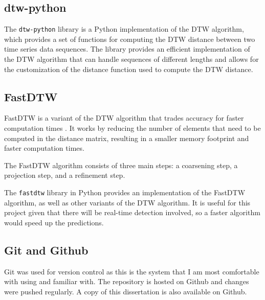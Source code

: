 \documentclass[final,rdr32.tex]{subfiles}
\begin{document}
\subsection{dtw-python}

The \verb|dtw-python| library is a Python implementation of the DTW algorithm, which provides a set of functions for computing the DTW distance between two time series data sequences. The library provides an efficient implementation of the DTW algorithm that can handle sequences of different lengths and allows for the customization of the distance function used to compute the DTW distance.

\subsection{FastDTW}

FastDTW is a variant of the DTW algorithm that trades accuracy for faster computation times \cite{salvador2007toward}. It works by reducing the number of elements that need to be computed in the distance matrix, resulting in a smaller memory footprint and faster computation times.

The FastDTW algorithm consists of three main steps: a coarsening step, a projection step, and a refinement step.

The \verb|fastdtw| library in Python provides an implementation of the FastDTW algorithm, as well as other variants of the DTW algorithm. It is useful for this project given that there will be real-time detection involved, so a faster algorithm would speed up the predictions.

\subsection{Git and Github}

Git was used for version control as this is the system that I am most comfortable with using and familiar with. The repository is hosted on Github and changes were pushed regularly. A copy of this dissertation is also available on Github.
\end{document}

